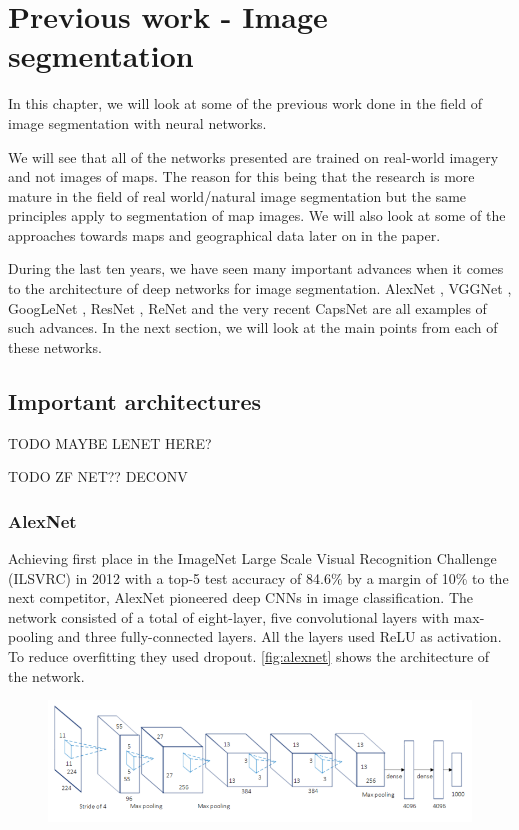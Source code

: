 \chapter{Previous work - Image segmentation}\label{sec:previous-work-segmentation}
In this chapter, we will look at some of the previous work done in the field of image segmentation with neural networks. 

We will see that all of the networks presented are trained on real-world imagery and not images of maps. The reason for this being that the research is more mature in the field of real world/natural image segmentation but the same principles apply to segmentation of map images. We will also look at some of the approaches towards maps and geographical data later on in the paper.

During the last ten years, we have seen many important advances when it comes to the architecture of deep networks for image segmentation. AlexNet \cite{Krizhevsky2012}, VGGNet \cite{Simonyan2014a}, GoogLeNet \cite{Szegedy2014}, ResNet \cite{He2015}, ReNet \cite{Visin2015} and the very recent CapsNet \cite{Sabour2017} are all examples of such advances. In the next section, we will look at the main points from each of these networks.

\section{Important architectures}\label{sec:important-architectures}

TODO MAYBE LENET HERE?

TODO ZF NET?? DECONV

\subsection{AlexNet}
Achieving first place in the ImageNet Large Scale Visual Recognition Challenge (ILSVRC) \cite{Russakovsky2015}  in 2012 with a top-5 test accuracy of 84.6\% by a margin of 10\% to the next competitor, AlexNet pioneered deep CNNs in image classification. The network consisted of a total of eight-layer, five convolutional layers with max-pooling and three fully-connected layers. All the layers used ReLU as activation. To reduce overfitting they used dropout. \autoref{fig:alexnet} shows the architecture of the network.

\begin{figure}[H]
	\centering
	\includegraphics[width=0.7\linewidth]{fig/alexnet.png}
	\label{fig:alexnet}
\end{figure}


